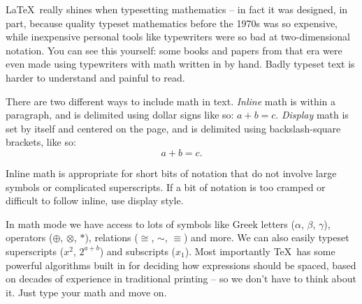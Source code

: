 \documentclass{article}
\begin{document}
\LaTeX\ really shines when typesetting mathematics -- in fact it was designed, in part, because quality typeset mathematics before the 1970s was so expensive, while inexpensive personal tools like typewriters were so bad at two-dimensional notation. You can see this yourself: some books and papers from that era were even made using typewriters with math written in by hand. Badly typeset text is harder to understand and painful to read.

There are two different ways to include math in text. \emph{Inline} math is within a paragraph, and is delimited using dollar signs like so: $a + b = c$. \emph{Display} math is set by itself and centered on the page, and is delimited using backslash-square brackets, like so: \[ a + b = c. \]

Inline math is appropriate for short bits of notation that do not involve large symbols or complicated superscripts. If a bit of notation is too cramped or difficult to follow inline, use display style.

In math mode we have access to lots of symbols like Greek letters ($\alpha$, $\beta$, $\gamma$), operators ($\oplus$, $\otimes$, $\ast$), relations ($\cong$, $\sim$, $\equiv$) and more. We can also easily typeset superscripts ($x^2$, $2^{a+b}$) and subscripts ($x_1$). Most importantly \TeX\ has some powerful algorithms built in for deciding how expressions should be spaced, based on decades of experience in traditional printing -- so we don't have to think about it. Just type your math and move on.
\end{document}
